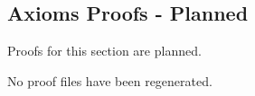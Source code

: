 \subsection*{Axioms Proofs - Planned}

Proofs for this section are planned.

No proof files have been regenerated.
